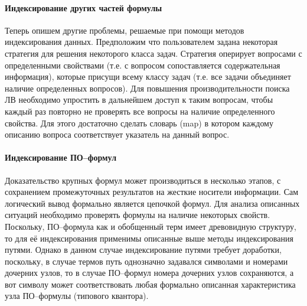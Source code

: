 \paragraph{Индексирование других частей формулы}
Теперь опишем другие проблемы, решаемые при помощи методов индексирования данных. Предположим что пользователем задана некоторая стратегия для решения некоторого класса задач. Стратегия оперирует вопросами с определенными свойствами (т.е. с вопросом сопоставляется содержательная информация), которые присущи всему классу задач (т.е. все задачи объединяет наличие определенных вопросов). Для повышения производительности поиска ЛВ необходимо упростить в дальнейшем доступ к таким вопросам, чтобы каждый раз повторно не проверять все вопросы на наличие определенного свойства. Для этого достаточно сделать словарь (map) в котором каждому описанию вопроса соответствует указатель на данный вопрос. %


\paragraph{Индексирование ПО--формул} Доказательство крупных формул может производиться в несколько этапов, с сохранением промежуточных результатов на жесткие носители информации. Сам логический вывод формально является цепочкой формул. Для анализа описанных ситуаций необходимо проверять формулы на наличие некоторых свойств. Поскольку, ПО--формула как и обобщенный терм имеет древовидную структуру, то для её индексирования применимы описанные выше методы индексирования путями. Однако в данном случае индексирование путями требует доработки, поскольку, в случае термов путь однозначно задавался символами и номерами дочерних узлов, то в случае ПО--формул номера дочерних узлов сохраняются, а вот символу может соответствовать любая формально описанная характеристика узла ПО--формулы (типового квантора). %


